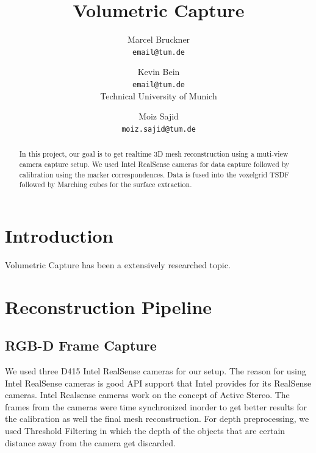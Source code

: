 \documentclass[10pt,twocolumn,letterpaper]{article}
\begin{document}
\title{Volumetric Capture}

\author{Marcel Bruckner\\
{\tt\small email@tum.de}
\and
Kevin Bein\\
{\tt\small email@tum.de}\\
Technical University of Munich
\and
Moiz Sajid\\
{\tt\small moiz.sajid@tum.de}
}

\maketitle

\begin{abstract}
   In this project, our goal is to get realtime 3D mesh reconstruction using a muti-view camera capture setup. We used Intel RealSense cameras for data capture followed by calibration using the marker correspondences. Data is fused into the voxelgrid TSDF followed by Marching cubes for the surface extraction.  
\end{abstract}

\section{Introduction}

Volumetric Capture has been a extensively researched topic.

\section{Reconstruction Pipeline}

\subsection{RGB-D Frame Capture}
We used three D415 Intel RealSense cameras for our setup. The reason for using Intel RealSense cameras is good API support that Intel provides for its RealSense cameras. Intel Realsense cameras work on the concept of Active Stereo. The frames from the cameras were time synchronized inorder to get better results for the calibration as well the final mesh reconstruction. For depth preprocessing, we used Threshold Filtering in which the depth of the objects that are certain distance away from the camera get discarded. 
\end{document}

